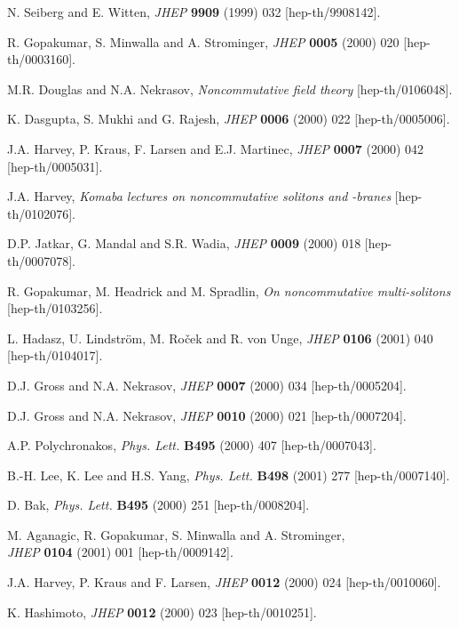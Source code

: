 \documentclass[a4paper,11pt]{article}
\numberwithin{equation}{section}
\begin{document}
\begin{thebibliography}{99}

N. Seiberg and E. Witten,
{\sl JHEP} {\bf 9909} (1999) 032 [hep-th/9908142].

R. Gopakumar, S. Minwalla and A. Strominger,
{\sl JHEP} {\bf 0005} (2000) 020 [hep-th/0003160].

M.R. Douglas and N.A. Nekrasov,
{\it Noncommutative field theory} [hep-th/0106048].

K. Dasgupta, S. Mukhi and G. Rajesh,
{\sl JHEP} {\bf 0006} (2000) 022 [hep-th/0005006].

J.A. Harvey, P. Kraus, F. Larsen and E.J. Martinec,
{\sl JHEP} {\bf 0007} (2000) 042 [hep-th/0005031].

J.A. Harvey,
{\it Komaba lectures on noncommutative solitons and \coordHE{}-branes}
[hep-th/0102076].

D.P. Jatkar, G. Mandal and S.R. Wadia,
{\sl JHEP} {\bf 0009} (2000) 018 [hep-th/0007078].

R. Gopakumar, M. Headrick and M. Spradlin,
{\it On noncommutative multi-solitons}\\{}
[hep-th/0103256].

L. Hadasz, U. Lindstr\"om, M. Ro\v cek and R. von Unge,
{\sl JHEP} {\bf 0106} (2001) 040
[hep-th/0104017].

D.J. Gross and N.A. Nekrasov,
{\sl JHEP} {\bf 0007} (2000) 034 [hep-th/0005204].

D.J. Gross and N.A. Nekrasov,
{\sl JHEP} {\bf 0010} (2000) 021 [hep-th/0007204].

A.P. Polychronakos,
{\sl Phys. Lett.} {\bf B495} (2000) 407 [hep-th/0007043].

B.-H. Lee, K. Lee and H.S. Yang,
{\sl Phys. Lett.} {\bf B498} (2001) 277 [hep-th/0007140].

D. Bak,
{\sl Phys. Lett.} {\bf B495} (2000) 251 [hep-th/0008204].

M. Aganagic, R. Gopakumar, S. Minwalla and A. Strominger, \\
{\sl JHEP} {\bf 0104} (2001) 001 [hep-th/0009142].

J.A. Harvey, P. Kraus and F. Larsen,
{\sl JHEP} {\bf 0012} (2000) 024 [hep-th/0010060].

K. Hashimoto,
{\sl JHEP} {\bf 0012} (2000) 023 [hep-th/0010251].


\end{thebibliography}
\end{document}
